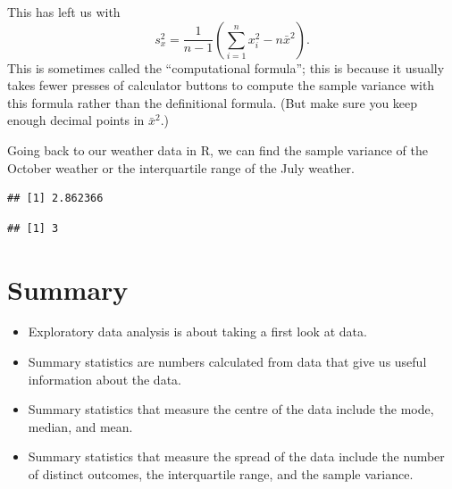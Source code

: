 \documentclass[
  a4paper,
]{book}
\newenvironment{Shaded}{\begin{snugshade}}{\end{snugshade}}
\newcommand{\FunctionTok}[1]{\textcolor[rgb]{0.00,0.00,0.00}{#1}}
\newcommand{\NormalTok}[1]{#1}
\newcommand{\SpecialCharTok}[1]{\textcolor[rgb]{0.00,0.00,0.00}{#1}}
\providecommand{\tightlist}{%
  \setlength{\itemsep}{0pt}\setlength{\parskip}{0pt}}
\theoremstyle{definition}
\theoremstyle{definition}
\theoremstyle{definition}
\theoremstyle{definition}
\theoremstyle{remark}
\begin{document}
This has left us with
\[ s^2_x = \frac{1}{n-1} \left(\sum_{i=1}^n x_i^2 -  n\bar x^2 \right) . \]
This is sometimes called the ``computational formula''; this is because it usually takes fewer presses of calculator buttons to compute the sample variance with this formula rather than the definitional formula. (But make sure you keep enough decimal points in \(\bar x^2\).)

Going back to our weather data in R, we can find the sample variance of the October weather or the interquartile range of the July weather.

\begin{Shaded}
\end{Shaded}

\begin{verbatim}
## [1] 2.862366
\end{verbatim}

\begin{Shaded}
\end{Shaded}

\begin{verbatim}
## [1] 3
\end{verbatim}

\hypertarget{summary-01}{%
\section*{Summary}\label{summary-01}}

\begin{itemize}
\tightlist
\item
  Exploratory data analysis is about taking a first look at data.
\item
  Summary statistics are numbers calculated from data that give us useful information about the data.
\item
  Summary statistics that measure the centre of the data include the mode, median, and mean.
\item
  Summary statistics that measure the spread of the data include the number of distinct outcomes, the interquartile range, and the sample variance.
\end{itemize}
\end{document}
